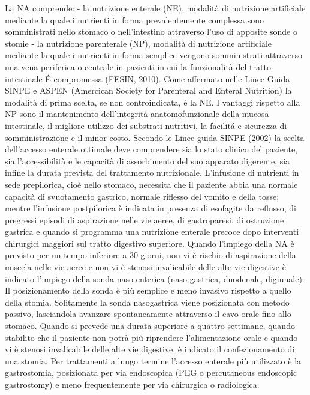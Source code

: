 \documentclass[12pt,a4paper,oneside]{book}
\begin{document}
La NA comprende:
- la nutrizione enterale (NE), modalit\`a di nutrizione artificiale mediante la quale i nutrienti in forma prevalentemente complessa sono somministrati nello stomaco o nell'intestino attraverso l'uso di apposite sonde o stomie
- la nutrizione parenterale (NP), modalit\`a di nutrizione artificiale mediante la quale i nutrienti in forma semplice vengono somministrati attraverso una vena periferica o centrale in pazienti in cui la funzionalit\`a del tratto intestinale \'E compromessa (FESIN, 2010).
Come affermato nelle Linee Guida SINPE e ASPEN (Amercican Society for Parenteral and Enteral Nutrition) la modalit\`a di prima scelta, se non controindicata, \`e la NE. I vantaggi rispetto alla NP sono il mantenimento dell'integrit\`a anatomofunzionale della mucosa intestinale, il migliore utilizzo dei substrati nutritivi, la facilit\'a e sicurezza di somministrazione e il minor costo. 
Secondo le Linee guida SINPE (2002) la scelta dell'accesso enterale ottimale deve comprendere sia lo stato clinico del paziente, sia l'accessibilit\`a e le capacit\`a di assorbimento del suo apparato digerente, sia infine la durata prevista del trattamento nutrizionale. 
L'infusione di nutrienti in sede prepilorica, cio\`e nello stomaco, necessita che il paziente abbia una normale capacit\`a di svuotamento gastrico, normale riflesso del vomito e della tosse; mentre l'infusione postpilorica \`e indicata in presenza di esofagite da reflusso, di pregressi episodi di aspirazione nelle vie aeree, di gastroparesi, di ostruzione gastrica e quando si programma una nutrizione enterale precoce dopo interventi chirurgici maggiori sul tratto digestivo superiore. 
Quando l'impiego della NA \`e previsto per un tempo inferiore a 30 giorni, non vi \`e rischio di aspirazione della miscela nelle vie aeree e non vi \`e stenosi invalicabile delle alte vie digestive \`e indicato l'impiego della sonda naso-enterica (naso-gastrica, duodenale, digiunale). 
Il posizionamento della sonda \`e pi\`u semplice e meno invasivo rispetto a quello della stomia. Solitamente la sonda nasogastrica viene posizionata con metodo passivo, lasciandola avanzare spontaneamente attraverso il cavo orale fino allo stomaco. 
Quando si prevede una durata superiore a quattro settimane, quando stabilito che il paziente non potr\`a pi\`u riprendere l'alimentazione orale e quando vi \`e stenosi invalicabile delle alte vie digestive, \`e indicato il confezionamento di una stomia.
Per trattamenti a lungo termine l'accesso enterale pi\`u utilizzato \`e la gastrostomia, posizionata per via endoscopica (PEG o percutaneous endoscopic gastrostomy) e meno frequentemente per via chirurgica o radiologica. 
\end{document}
